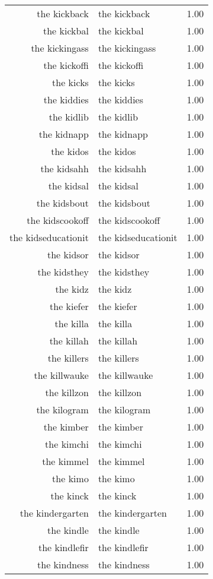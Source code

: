\begin{table}[ht]
\begin{tabular}{rlr}
  the kickback & the kickback & 1.00 \\ 
  the kickbal & the kickbal & 1.00 \\ 
  the kickingass & the kickingass & 1.00 \\ 
  the kickoffi & the kickoffi & 1.00 \\ 
  the kicks & the kicks & 1.00 \\ 
  the kiddies & the kiddies & 1.00 \\ 
  the kidlib & the kidlib & 1.00 \\ 
  the kidnapp & the kidnapp & 1.00 \\ 
  the kidos & the kidos & 1.00 \\ 
  the kidsahh & the kidsahh & 1.00 \\ 
  the kidsal & the kidsal & 1.00 \\ 
  the kidsbout & the kidsbout & 1.00 \\ 
  the kidscookoff & the kidscookoff & 1.00 \\ 
  the kidseducationit & the kidseducationit & 1.00 \\ 
  the kidsor & the kidsor & 1.00 \\ 
  the kidsthey & the kidsthey & 1.00 \\ 
  the kidz & the kidz & 1.00 \\ 
  the kiefer & the kiefer & 1.00 \\ 
  the killa & the killa & 1.00 \\ 
  the killah & the killah & 1.00 \\ 
  the killers & the killers & 1.00 \\ 
  the killwauke & the killwauke & 1.00 \\ 
  the killzon & the killzon & 1.00 \\ 
  the kilogram & the kilogram & 1.00 \\ 
  the kimber & the kimber & 1.00 \\ 
  the kimchi & the kimchi & 1.00 \\ 
  the kimmel & the kimmel & 1.00 \\ 
  the kimo & the kimo & 1.00 \\ 
  the kinck & the kinck & 1.00 \\ 
  the kindergarten & the kindergarten & 1.00 \\ 
  the kindle & the kindle & 1.00 \\ 
  the kindlefir & the kindlefir & 1.00 \\ 
  the kindness & the kindness & 1.00 \\ 

\end{tabular}
\end{table}
